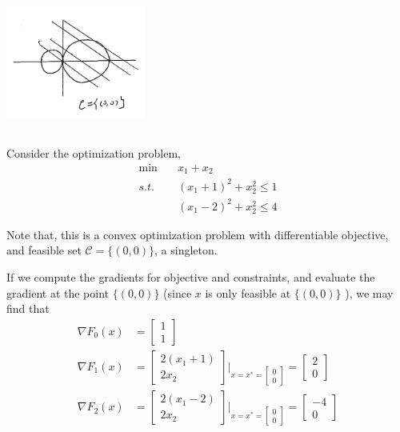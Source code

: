 \begin{example}
	\begin{marginfigure}
		\centering
		\includegraphics[width=1.8in,height=1.8in]{figures/ch10/figure1204_5.png}
	\end{marginfigure}
Consider the optimization problem,
\begin{align*}
\min \quad & x_1+x_2\\
s.t. \quad & (x_1+1)^2 + x_2^2 \leq 1\\
&(x_1-2)^2 + x_2^2 \leq 4
\end{align*}

Note that, this is a convex optimization problem with differentiable objective, and feasible set $\mathcal{C}=\{(0, 0)\}$, a singleton.


If we compute the gradients for objective and constraints, and evaluate the gradient at the point $\{(0, 0)\}$ (since $x$ is only feasible at $\{(0, 0)\}$ ), we may find that
\begin{align*}
\nabla F_0(x) &=
\begin{bmatrix}
1\\
1
\end{bmatrix}\\
\nabla F_1(x) &=
\begin{bmatrix}
2(x_1+1)\\
2x_2
\end{bmatrix}
|_{x=x^*=
	\begin{bmatrix}
	0\\
	0
	\end{bmatrix}
}=
\begin{bmatrix}
2\\
0
\end{bmatrix}\\
\nabla F_2(x) &=
\begin{bmatrix}
2(x_1-2)\\
2x_2
\end{bmatrix}
|_{x=x^*=
	\begin{bmatrix}
	0\\
	0
	\end{bmatrix}
}=
\begin{bmatrix}
-4\\
0
\end{bmatrix}\\
\end{align*}


\end{example}
